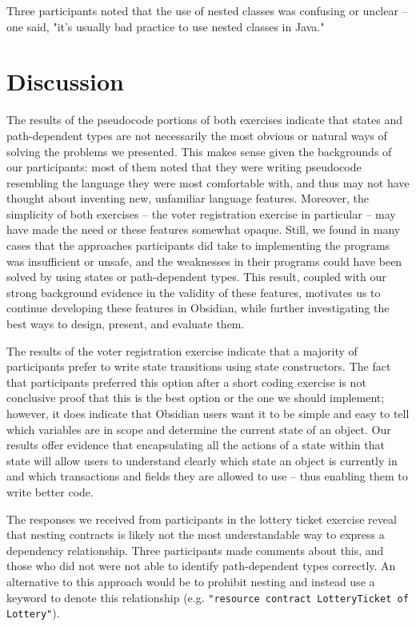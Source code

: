 \documentclass[sigplan,10pt,review]{acmart}\settopmatter{printfolios=true}
\begin{document}
Three participants noted that the use of nested classes was confusing or unclear -- one said, "it's usually bad practice to use nested 
classes in Java."

\section{Discussion}

The results of the pseudocode portions of both exercises indicate that states and path-dependent types are not necessarily the most obvious or 
natural ways of solving the problems we presented. This makes sense given the backgrounds of our participants: most of them noted that they 
were writing pseudocode resembling the language they were most comfortable with, and thus may not have thought about inventing new, 
unfamiliar language features. Moreover, the simplicity of both exercises -- the voter registration exercise in particular -- may have made the 
need or these features somewhat opaque. Still, we found in many cases that the approaches participants did take to implementing the 
programs was insufficient or unsafe, and the weaknesses in their programs could have been solved by using states or path-dependent 
types. This result, coupled with our strong background evidence in the validity of these features, motivates us to continue developing these
features in Obsidian, while further investigating the best ways to design, present, and evaluate them. 

The results of the voter registration exercise indicate that a majority of participants prefer to write state transitions using state constructors. The 
fact that participants preferred this option after a short coding exercise is not conclusive proof that this is the best option or the one we should 
implement; however, it does indicate that Obsidian users want it to be simple and easy to tell which variables are in scope and determine the 
current state of an object. Our results offer evidence that encapsulating all the actions of a state within that state will allow users to understand 
clearly which state an object is currently in and which transactions and fields they are allowed to use -- thus enabling them to write better code. 

The responses we received from participants in the lottery ticket exercise reveal that nesting contracts is likely not the most understandable
way to express a dependency relationship. Three participants made comments about this, and those who did not were not 
able to identify path-dependent types correctly. An alternative to this approach would be to prohibit nesting and instead use a keyword
to denote this relationship (e.g. \texttt{\small{"resource contract LotteryTicket of Lottery"}}).
\end{document}
